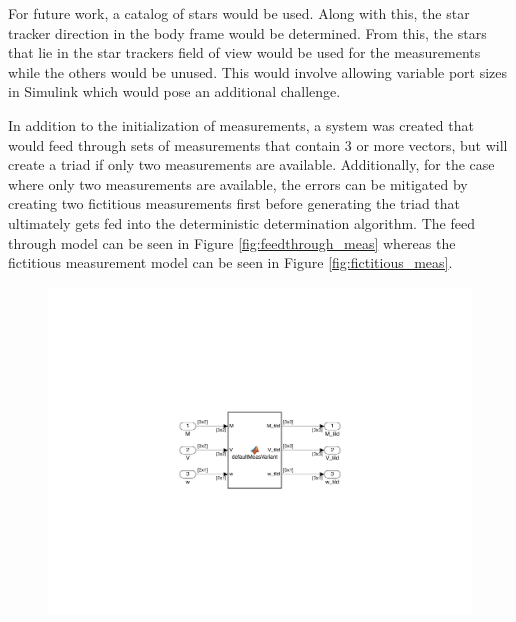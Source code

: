 For future work, a catalog of stars would be used. Along with this, the star tracker direction in the body frame would be determined. From this, the stars that lie in the star trackers field of view would be used for the measurements while the others would be unused. This would involve allowing variable port sizes in Simulink which would pose an additional challenge.

In addition to the initialization of measurements, a system was created that would feed through sets of measurements that contain 3 or more vectors, but will create a triad if only two measurements are available. Additionally, for the case where only two measurements are available, the errors can be mitigated by creating two fictitious measurements first before generating the triad that ultimately gets fed into the deterministic determination algorithm. The feed through model can be seen in Figure \ref{fig:feedthrough_meas} whereas the fictitious measurement model can be seen in Figure \ref{fig:fictitious_meas}.

\begin{figure}[H]
    \centering
    \includegraphics[trim={8cm 5cm 8cm 7cm},clip,width = 12cm]{Images/PS6/feedthrough_meas.png}
\end{figure}

